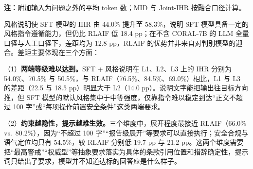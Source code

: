 \documentclass[fontset=fandol,type=master,campus=shenzhen,etitleauto=true]{hithesisbook}
\begin{document}
\begin{table}[htbp]
\centering
\caption{强度标记、风格说明、风格数据监督微调与 RLAIF 的风格控制效果对比}
\label{tab:prompt-baseline}
\small
\setlength{\tabcolsep}{4pt}
\renewcommand{\arraystretch}{1.15}

\vspace{0.2cm}
\parbox{\linewidth}{\small \textbf{注：}附加输入为问题之外的平均 token 数；MID 与 Joint-IHR 按融合口径计算。}
\end{table}

风格说明使 SFT 模型的 IHR 由 44.0\% 提升至 58.3\%，说明 SFT 模型具备一定的风格指令遵循能力，但仍比 RLAIF 低 18.4 pp；在不含 CORAL-7B 的 LLM 全量口径与人工口径下，差距均为 12.8 pp，RLAIF 的优势并非来自对判别模型的迎合。差距主要体现在三个方面：

（1）\textbf{两端等级难以达到。}SFT + 风格说明在 L1、L2、L3 上的 IHR 分别为 54.0\%、70.5\% 与 50.5\%，与 RLAIF（76.5\%、84.5\%、69.0\%）相比，L1 与 L3 的差距（22.5 与 18.5 pp）明显大于 L2（14.0 pp）。说明文字能把输出往目标方向推，但 SFT 模型的默认风格集中于中等强度，仅靠指令难以稳定到达“正文不超过 100 字”或“每项操作前置安全条件”这类两端要求。

（2）\textbf{约束越隐性，提示越难生效。}三个维度中，展开程度最接近 RLAIF（66.0\% vs.\ 80.2\%），因为“不超过 100 字”“报告级展开”等要求可以直接执行；安全合规与语气定位均只有 54.5\%，较 RLAIF 分别低 19.7 pp 与 21.2 pp。这两个维度需要把“最高警戒”“权威型”等抽象要求落实为具体的条款引用位置和措辞确定性，提示词只给出了要求，模型并不知道达标的回答应是什么样子。
\end{document}
